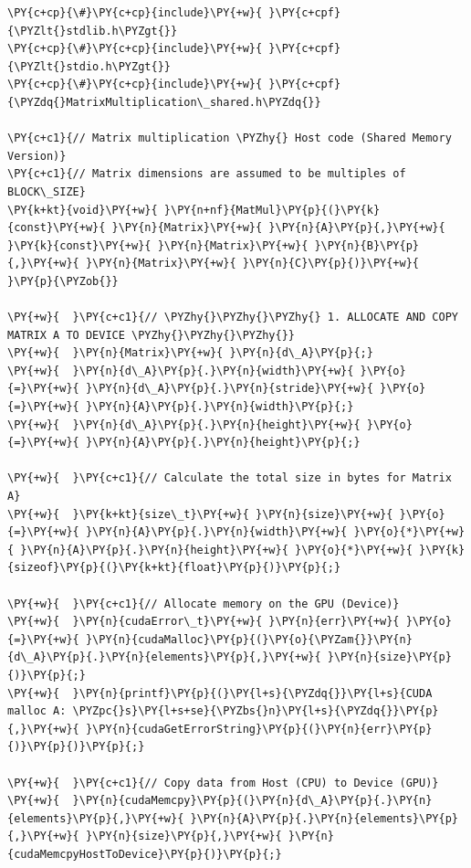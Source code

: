 \begin{Verbatim}[label=\makebox{\url{https://github.com/lucabaldini/cmepda/tree/master/slides/latex/snippets/MatrixMultiplication_shared.cu}},commandchars=\\\{\}]
\PY{c+cp}{\#}\PY{c+cp}{include}\PY{+w}{ }\PY{c+cpf}{\PYZlt{}stdlib.h\PYZgt{}}
\PY{c+cp}{\#}\PY{c+cp}{include}\PY{+w}{ }\PY{c+cpf}{\PYZlt{}stdio.h\PYZgt{}}
\PY{c+cp}{\#}\PY{c+cp}{include}\PY{+w}{ }\PY{c+cpf}{\PYZdq{}MatrixMultiplication\_shared.h\PYZdq{}}

\PY{c+c1}{// Matrix multiplication \PYZhy{} Host code (Shared Memory Version)}
\PY{c+c1}{// Matrix dimensions are assumed to be multiples of BLOCK\_SIZE}
\PY{k+kt}{void}\PY{+w}{ }\PY{n+nf}{MatMul}\PY{p}{(}\PY{k}{const}\PY{+w}{ }\PY{n}{Matrix}\PY{+w}{ }\PY{n}{A}\PY{p}{,}\PY{+w}{ }\PY{k}{const}\PY{+w}{ }\PY{n}{Matrix}\PY{+w}{ }\PY{n}{B}\PY{p}{,}\PY{+w}{ }\PY{n}{Matrix}\PY{+w}{ }\PY{n}{C}\PY{p}{)}\PY{+w}{ }\PY{p}{\PYZob{}}

\PY{+w}{  }\PY{c+c1}{// \PYZhy{}\PYZhy{}\PYZhy{} 1. ALLOCATE AND COPY MATRIX A TO DEVICE \PYZhy{}\PYZhy{}\PYZhy{}}
\PY{+w}{  }\PY{n}{Matrix}\PY{+w}{ }\PY{n}{d\_A}\PY{p}{;}
\PY{+w}{  }\PY{n}{d\_A}\PY{p}{.}\PY{n}{width}\PY{+w}{ }\PY{o}{=}\PY{+w}{ }\PY{n}{d\_A}\PY{p}{.}\PY{n}{stride}\PY{+w}{ }\PY{o}{=}\PY{+w}{ }\PY{n}{A}\PY{p}{.}\PY{n}{width}\PY{p}{;}
\PY{+w}{  }\PY{n}{d\_A}\PY{p}{.}\PY{n}{height}\PY{+w}{ }\PY{o}{=}\PY{+w}{ }\PY{n}{A}\PY{p}{.}\PY{n}{height}\PY{p}{;}

\PY{+w}{  }\PY{c+c1}{// Calculate the total size in bytes for Matrix A}
\PY{+w}{  }\PY{k+kt}{size\_t}\PY{+w}{ }\PY{n}{size}\PY{+w}{ }\PY{o}{=}\PY{+w}{ }\PY{n}{A}\PY{p}{.}\PY{n}{width}\PY{+w}{ }\PY{o}{*}\PY{+w}{ }\PY{n}{A}\PY{p}{.}\PY{n}{height}\PY{+w}{ }\PY{o}{*}\PY{+w}{ }\PY{k}{sizeof}\PY{p}{(}\PY{k+kt}{float}\PY{p}{)}\PY{p}{;}

\PY{+w}{  }\PY{c+c1}{// Allocate memory on the GPU (Device)}
\PY{+w}{  }\PY{n}{cudaError\_t}\PY{+w}{ }\PY{n}{err}\PY{+w}{ }\PY{o}{=}\PY{+w}{ }\PY{n}{cudaMalloc}\PY{p}{(}\PY{o}{\PYZam{}}\PY{n}{d\_A}\PY{p}{.}\PY{n}{elements}\PY{p}{,}\PY{+w}{ }\PY{n}{size}\PY{p}{)}\PY{p}{;}
\PY{+w}{  }\PY{n}{printf}\PY{p}{(}\PY{l+s}{\PYZdq{}}\PY{l+s}{CUDA malloc A: \PYZpc{}s}\PY{l+s+se}{\PYZbs{}n}\PY{l+s}{\PYZdq{}}\PY{p}{,}\PY{+w}{ }\PY{n}{cudaGetErrorString}\PY{p}{(}\PY{n}{err}\PY{p}{)}\PY{p}{)}\PY{p}{;}

\PY{+w}{  }\PY{c+c1}{// Copy data from Host (CPU) to Device (GPU)}
\PY{+w}{  }\PY{n}{cudaMemcpy}\PY{p}{(}\PY{n}{d\_A}\PY{p}{.}\PY{n}{elements}\PY{p}{,}\PY{+w}{ }\PY{n}{A}\PY{p}{.}\PY{n}{elements}\PY{p}{,}\PY{+w}{ }\PY{n}{size}\PY{p}{,}\PY{+w}{ }\PY{n}{cudaMemcpyHostToDevice}\PY{p}{)}\PY{p}{;}


\end{Verbatim}
